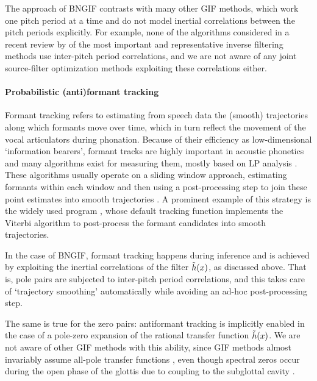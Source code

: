 \begin{chaptersections}
The approach of BNGIF contrasts with many other GIF methods, which work one pitch period at a time and do not model inertial correlations between the pitch periods explicitly.
For example, none of the algorithms considered in a recent review by \cite{Chien2017} of the most important and representative inverse filtering methods use inter-pitch period correlations, and we are not aware of any joint source-filter optimization methods exploiting these correlations either.


\paragraph{Probabilistic (anti)formant tracking}
Formant tracking refers to estimating from speech data the (smooth) trajectories along which formants move over time, which in turn reflect the movement of the vocal articulators during phonation.
Because of their efficiency as low-dimensional `information bearers', formant tracks are highly important in acoustic phonetics and many algorithms exist for measuring them, mostly based on LP analysis \citep{VanSoom2020}.
These algorithms usually operate on a sliding window approach, estimating formants within each window and then using a  post-processing step to join these point estimates into smooth trajectories \citep{Whalen2022}.
A prominent example of this strategy is the widely used \Praat program \citep{Boersma2001}, whose default tracking function implements the Viterbi algorithm \citep{Viterbi1967} to post-process the formant candidates into smooth trajectories.

In the case of BNGIF, formant tracking happens during inference and is achieved by exploiting the inertial correlations of the filter $\tilde{h}(x)$, as discussed above.
That is, pole pairs are subjected to inter-pitch period correlations, and this takes care of `trajectory smoothing' automatically while avoiding an ad-hoc post-processing step.

The same is true for the zero pairs: antiformant tracking is implicitly enabled in the case of a pole-zero expansion of the rational transfer function $\tilde{h}(x)$. %
We are not aware of other GIF methods with this ability, since GIF methods almost invariably assume all-pole transfer functions \citep{Alku2011,Kadiri2021,Bleyer2017}, even though spectral zeros occur during the open phase of the glottis due to coupling to the subglottal cavity \citep{Ananthapadmanabha1982,Plumpe1999}. %


\end{chaptersections}
